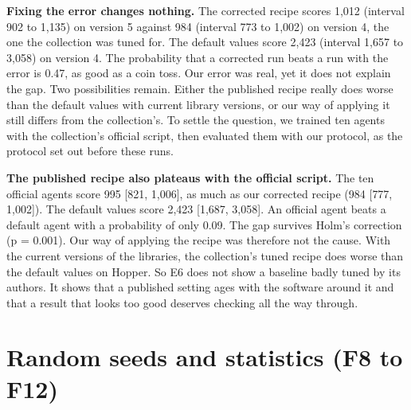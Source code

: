 \documentclass[11pt,a4paper]{article}
\begin{document}
\textbf{Fixing the error changes nothing.} The corrected recipe scores
1,012 (interval 902 to 1,135) on version 5 against 984 (interval 773 to
1,002) on version 4, the one the collection was tuned for. The default
values score 2,423 (interval 1,657 to 3,058) on version 4. The
probability that a corrected run beats a run with the error is 0.47, as
good as a coin toss. Our error was real, yet it does not explain the
gap. Two possibilities remain. Either the published recipe really does
worse than the default values with current library versions, or our way
of applying it still differs from the collection's. To settle the
question, we trained ten agents with the collection's official script,
then evaluated them with our protocol, as the protocol set out before
these runs.

\textbf{The published recipe also plateaus with the official script.}
The ten official agents score 995 {[}821, 1,006{]}, as much as our
corrected recipe (984 {[}777, 1,002{]}). The default values score 2,423
{[}1,687, 3,058{]}. An official agent beats a default agent with a
probability of only 0.09. The gap survives Holm's correction (p =
0.001). Our way of applying the recipe was therefore not the cause. With
the current versions of the libraries, the collection's tuned recipe
does worse than the default values on Hopper. So E6 does not show a
baseline badly tuned by its authors. It shows that a published setting
ages with the software around it and that a result that looks too good
deserves checking all the way through.

\section{Random seeds and statistics (F8 to
F12)}\label{random-seeds-and-statistics-f8-to-f12}
\end{document}
